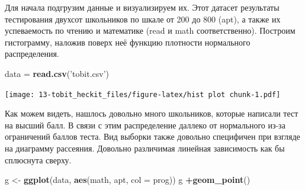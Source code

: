 \documentclass[]{book}
\newenvironment{Shaded}{\begin{snugshade}}{\end{snugshade}}
\newcommand{\CommentTok}[1]{\textcolor[rgb]{0.56,0.35,0.01}{\textit{#1}}}
\newcommand{\ControlFlowTok}[1]{\textcolor[rgb]{0.13,0.29,0.53}{\textbf{#1}}}
\newcommand{\DataTypeTok}[1]{\textcolor[rgb]{0.13,0.29,0.53}{#1}}
\newcommand{\DecValTok}[1]{\textcolor[rgb]{0.00,0.00,0.81}{#1}}
\newcommand{\KeywordTok}[1]{\textcolor[rgb]{0.13,0.29,0.53}{\textbf{#1}}}
\newcommand{\NormalTok}[1]{#1}
\newcommand{\OperatorTok}[1]{\textcolor[rgb]{0.81,0.36,0.00}{\textbf{#1}}}
\newcommand{\StringTok}[1]{\textcolor[rgb]{0.31,0.60,0.02}{#1}}
\begin{document}
Для начала подгрузим данные и визуализируем их. Этот датасет результаты тестирования двухсот школьников по шкале от 200 до 800 (apt), а также их успеваемость по чтению и математике (read и math соответственно). Построим гистограмму, наложив поверх неё функцию плотности нормального распределения.

\begin{Shaded}
\begin{Highlighting}[]
\NormalTok{data =}\StringTok{ }\KeywordTok{read.csv}\NormalTok{(}\StringTok{'tobit.csv'}\NormalTok{)}
\end{Highlighting}
\end{Shaded}

\begin{Shaded}
\end{Shaded}

\texttt{[image: 13-tobit\_heckit\_files/figure-latex/hist plot chunk-1.pdf]}

Как можем видеть, нашлось довольно много школьников, которые написали тест на высший балл. В связи с этим распределение даллеко от нормального из-за ограничений баллов теста. Вид выборки также довольно специфичен при взгляде на диаграмму рассеяния. Довольно различимая линейная зависимость как бы сплюснута сверху.

\begin{Shaded}
\begin{Highlighting}[]
\NormalTok{g <-}\StringTok{ }\KeywordTok{ggplot}\NormalTok{(data, }\KeywordTok{aes}\NormalTok{(math, apt, }\DataTypeTok{col =}\NormalTok{ prog))}
\NormalTok{g }\OperatorTok{+}\KeywordTok{geom_point}\NormalTok{()}
\end{Highlighting}
\end{Shaded}
\end{document}
